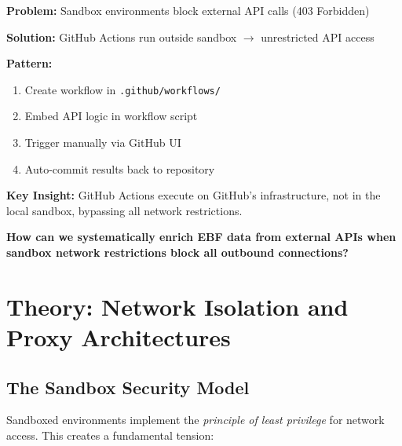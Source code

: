\begin{tcolorbox}[colback=blue!5, colframe=blue!50, title=Quick Reference]
\small
\textbf{Problem:} Sandbox environments block external API calls (403 Forbidden)

\textbf{Solution:} GitHub Actions run outside sandbox $\to$ unrestricted API access

\textbf{Pattern:}
\begin{enumerate}[noitemsep]
    \item Create workflow in \texttt{.github/workflows/}
    \item Embed API logic in workflow script
    \item Trigger manually via GitHub UI
    \item Auto-commit results back to repository
\end{enumerate}

\textbf{Key Insight:} GitHub Actions execute on GitHub's infrastructure, not in the local sandbox, bypassing all network restrictions.
\end{tcolorbox}

\begin{tcolorbox}[colback=red!5, colframe=red!50, title=Fundamental Question]
\large\centering
\textbf{How can we systematically enrich EBF data from external APIs when sandbox network restrictions block all outbound connections?}
\end{tcolorbox}

\section{Theory: Network Isolation and Proxy Architectures}
\label{sec:api-theory}

\subsection{The Sandbox Security Model}

Sandboxed environments implement the \emph{principle of least privilege} for network access. This creates a fundamental tension:

